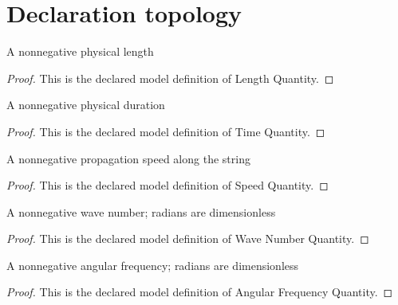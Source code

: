 \section{Declaration topology}
\begin{definition}
  \label{def:physics:phyx-mini-0289:phyxminiproblems-problemphyxmini0289-lengthquantity}
  A nonnegative physical length
\end{definition}
\begin{proof}
  This is the declared model definition of Length Quantity.
\end{proof}
\begin{definition}
  \label{def:physics:phyx-mini-0289:phyxminiproblems-problemphyxmini0289-timequantity}
  A nonnegative physical duration
\end{definition}
\begin{proof}
  This is the declared model definition of Time Quantity.
\end{proof}
\begin{definition}
  \label{def:physics:phyx-mini-0289:phyxminiproblems-problemphyxmini0289-speedquantity}
  A nonnegative propagation speed along the string
\end{definition}
\begin{proof}
  This is the declared model definition of Speed Quantity.
\end{proof}
\begin{definition}
  \label{def:physics:phyx-mini-0289:phyxminiproblems-problemphyxmini0289-wavenumberquantity}
  A nonnegative wave number; radians are dimensionless
\end{definition}
\begin{proof}
  This is the declared model definition of Wave Number Quantity.
\end{proof}
\begin{definition}
  \label{def:physics:phyx-mini-0289:phyxminiproblems-problemphyxmini0289-angularfrequencyquantity}
  A nonnegative angular frequency; radians are dimensionless
\end{definition}
\begin{proof}
  This is the declared model definition of Angular Frequency Quantity.
\end{proof}
